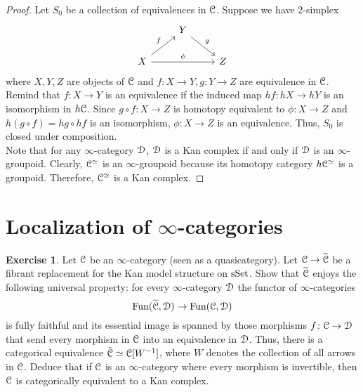 \documentclass[10pt,a4paper,reqno,oneside]{book} %
\theoremstyle{plain}
\theoremstyle{definition}
\newtheorem{exercise}[thm]{Exercise}
\theoremstyle{remark}
\numberwithin{equation}{section}
\begin{document}
\ifpersonal
\begin{proof}
    Let $S_0$ be a collection of equivalences in $\mathcal C$. Suppose we have 2-simplex
    \[ \begin{tikzcd}
	{} & Y \arrow{dr}{g} \\
	X \arrow{ur}{f} \arrow{rr}{\phi} & & Z
	\end{tikzcd} \]
	where $X,Y,Z$ are objects of $\mathcal C$ and $f:X \to Y, g:Y \to Z$ are equivalence in $\mathcal C$. Remind that $f:X \to Y$ is an equivalence if the induced map $hf:hX \to hY$ is an isomorphism in $h\mathcal C$. Since $g \circ f:X \to Z$ is homotopy equivalent to $\phi:X \to Z$ and $h(g\circ f)=hg\circ hf$ is an isomorphism, $\phi:X \to Z$ is an equivalence. Thus, $S_0$ is closed under composition.\\
	Note that for any $\infty$-category $\mathcal D$, $\mathcal D$ is a Kan complex if and only if $\mathcal D$ is an $\infty$-groupoid. \cite[Theorem 1.2.5.1]{HTT}
	Clearly, $\mathcal C^{\simeq}$ is an $\infty$-groupoid because its homotopy category $h\mathcal C^{\simeq}$ is a groupoid. Therefore, $\mathcal C^{\simeq}$ is a Kan complex. 
	
\end{proof}
\fi

\section{Localization of $\infty$-categories}

\begin{exercise} \label{ex:eveloping_groupoid}
	Let $\mathcal C$ be an $\infty$-category (seen as a quasicategory).
	Let $\mathcal C \to \widetilde{\mathcal C}$ be a fibrant replacement for the Kan model structure on $\mathrm{sSet}$.
	Show that $\widetilde{\mathcal C}$ enjoys the following universal property: for every $\infty$-category $\mathcal D$ the functor of $\infty$-categories
	\[ \operatorname{Fun}(\widetilde{\mathcal C}, \mathcal D) \to \operatorname{Fun}(\mathcal C, \mathcal D) \]
	is fully faithful and its essential image is spanned by those morphisms $f \colon \mathcal C \to \mathcal D$ that send every morphism in $\mathcal C$ into an equivalence in $\mathcal D$.
	Thus, there is a categorical equivalence $\tilde{\mathcal C} \simeq \mathcal C[W^{-1}]$, where $W$ denotes the collection of all arrows in $\mathcal C$.
	Deduce that if $\mathcal C$ is an $\infty$-category where every morphism is invertible, then $\mathcal C$ is categorically equivalent to a Kan complex.
\end{exercise}
\end{document}
